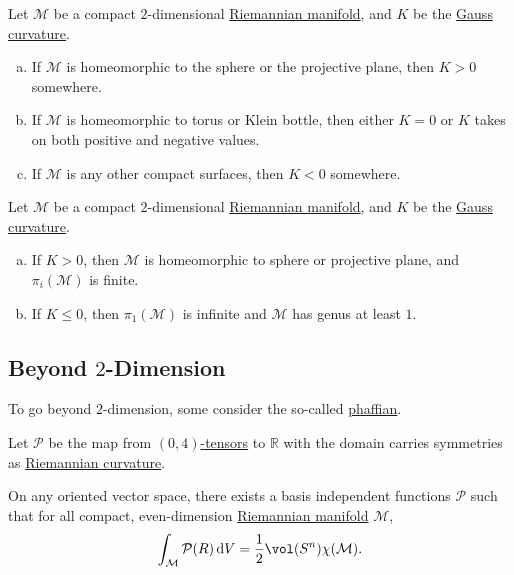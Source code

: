 \begin{corollary}
	Let \(\mathcal{M} \) be a compact \(2\)-dimensional \hyperref[def:Riemannian-manifold]{Riemannian manifold}, and \(K\) be the \hyperref[rmk:Gauss-curvature]{Gauss curvature}.
	\begin{enumerate}[(a)]
		\item If \(\mathcal{M} \) is homeomorphic to the sphere or the projective plane, then \(K > 0\) somewhere.
		\item If \(\mathcal{M} \) is homeomorphic to torus or Klein bottle, then either \(K = 0\) or \(K\) takes on both positive and negative values.
		\item If \(\mathcal{M} \) is any other compact surfaces, then \(K < 0\) somewhere.
	\end{enumerate}
\end{corollary}

\begin{corollary}
	Let \(\mathcal{M} \) be a compact \(2\)-dimensional \hyperref[def:Riemannian-manifold]{Riemannian manifold}, and \(K\) be the \hyperref[rmk:Gauss-curvature]{Gauss curvature}.
	\begin{enumerate}[(a)]
		\item If \(K > 0\), then \(\mathcal{M} \) is homeomorphic to sphere or projective plane, and \(\pi _i(\mathcal{M} )\) is finite.
		\item If \(K \leq 0\), then \(\pi _1(\mathcal{M} )\) is infinite and \(\mathcal{M} \) has genus at least \(1\).
	\end{enumerate}
\end{corollary}

\subsection{Beyond \(2\)-Dimension}
To go beyond \(2\)-dimension, some consider the so-called \hyperref[def:phaffian]{phaffian}.

\begin{definition}[Pfaffian]\label{def:phaffian}
	Let \(\mathcal{P} \) be the map from \hyperref[def:tensor-field]{\((0, 4)\)-tensors} to \(\mathbb{R} \) with the domain carries symmetries as \hyperref[def:Riemannian-curvature]{Riemannian curvature}.
\end{definition}

\begin{theorem}\label{thm:phaffian}
	On any oriented vector space, there exists a basis independent functions \(\mathcal{P} \) such that for all compact, even-dimension \hyperref[def:Riemannian-manifold]{Riemannian manifold} \(\mathcal{M} \),
	\[
		\int _\mathcal{M} \mathcal{P} (R)\,\mathrm{d} V = \frac{1}{2} \vol(S^n) \chi (\mathcal{M} ) .
	\]
\end{theorem}

